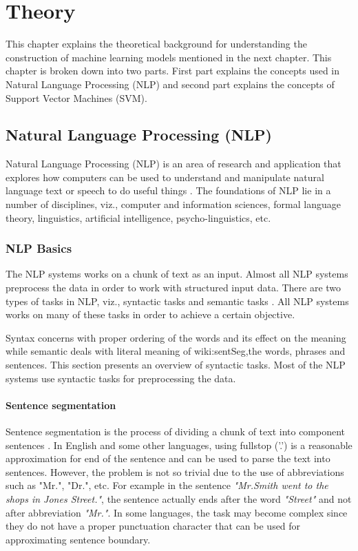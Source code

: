 \chapter{Theory}\label{chapter:theory}

This chapter explains the theoretical background for understanding the construction of machine learning models mentioned in the next chapter. This chapter is broken down into two parts. First part explains the concepts used in Natural Language Processing (NLP) and second part explains the concepts of Support Vector Machines (SVM).

\section{Natural Language Processing (NLP)}

Natural Language Processing (NLP) is an area of research and application that explores how computers can be used to understand and manipulate natural language text or speech to do useful things \cite{chowdhury2003natural}. The foundations of NLP lie in a number of disciplines, viz., computer and information sciences, formal language theory, linguistics, artificial intelligence, psycho-linguistics,  etc.

\subsection{NLP Basics}\label{sec:NLPPipeline}

The NLP systems works on a chunk of text as an input. Almost all NLP systems preprocess the data in order to work with structured input data. There are two types of tasks in NLP, viz., syntactic tasks and semantic tasks \cite{nlpcourse}. All NLP systems works on many of these tasks in order to achieve a certain objective.  

Syntax concerns with proper ordering of the words and its effect on the meaning while semantic deals with literal meaning of wiki:sentSeg,the words, phrases and sentences. This section presents an overview of syntactic tasks. Most of the NLP systems use syntactic tasks for preprocessing the data.

\subsubsection{Sentence segmentation}

Sentence segmentation is the process of dividing a chunk of text into component sentences \cite{wiki:sentSeg}. In English and some other languages, using fullstop ('.') is a reasonable approximation for end of the sentence and can be used to parse the text into sentences. However, the problem is not so trivial due to the use of abbreviations such as "Mr.", "Dr.", etc. For example in the sentence \textit{"Mr.Smith went to the shops in Jones Street."}, the sentence actually ends after the word \textit{"Street"} and not after abbreviation \textit{"Mr."}. In some languages, the task may become complex since they do not have a proper punctuation character that can be used for approximating sentence boundary.

